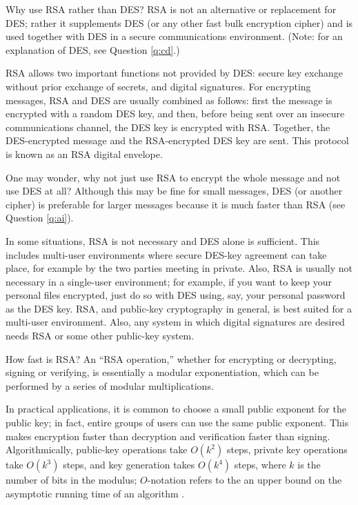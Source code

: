 {Why use RSA rather than DES?}
RSA is not an alternative or replacement for DES; rather it supplements
DES (or any other fast bulk encryption cipher) and is used together with DES 
in a secure communications environment. (Note: for an explanation of DES,
see Question \ref {q:cd}.)

RSA allows two important functions not provided by DES: secure key exchange 
without prior exchange of secrets, and digital signatures. For encrypting
messages, RSA and DES are usually combined as follows: first the message is 
encrypted with a random DES key, and then, before being sent over an insecure 
communications channel, the DES key is encrypted with RSA. Together, the 
DES-encrypted message and the RSA-encrypted DES key are sent. This protocol 
is known as an RSA digital envelope.

One may wonder, why not just use RSA to encrypt the whole message and not use 
DES at all? Although this may be fine for small messages, DES (or another 
cipher) is preferable for larger messages because it is much faster than RSA
(see Question \ref{q:ai}).

In some situations, RSA is not necessary and DES alone is sufficient. This 
includes multi-user environments where secure DES-key agreement can take 
place, for example by the two parties meeting in private. Also, RSA is 
usually not necessary in a single-user environment; for example, if you want 
to keep your personal files encrypted, just do so with DES using, say, your 
personal password as the DES key. RSA, and public-key cryptography in general,
is best suited for a multi-user environment. Also, any system in which digital
signatures are desired needs RSA or some other public-key system.

{How fast is RSA?}
An ``RSA operation,'' whether for encrypting or decrypting, signing
or verifying, is essentially a modular exponentiation, which can be 
performed by a series of modular multiplications.

In practical applications, it is common to choose a small public 
exponent for the public key; in fact, entire groups of users can use 
the same public exponent. This makes encryption faster than decryption 
and verification faster than signing. Algorithmically, public-key 
operations take $O(k^2)$ steps, private key operations take $O(k^3)$ 
steps, and key generation takes $O(k^4)$ steps, where $k$ is the number of 
bits in the modulus; $O$-notation refers to the an upper bound on the 
asymptotic running time of an algorithm \cite{cormen-l-rivest}.

